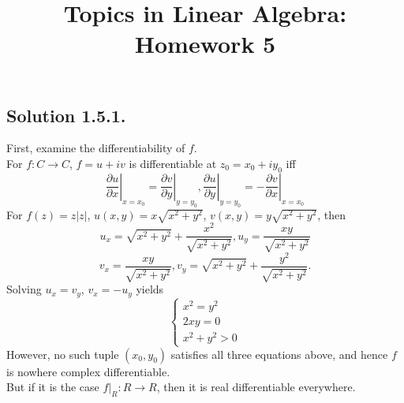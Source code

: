 \documentclass{article}
\title{Topics in Linear Algebra: Homework 5}
\begin{document}
\maketitle
\subsection*{Solution 1.5.1.}
First, examine the differentiability of $f$.\\
For $f: C\to C$, $f = u + iv$ is differentiable at $z_0=x_0+iy_0$ iff 
\[\left.\frac{\partial u}{\partial x}\right|_{x=x_0}= \left.\frac{\partial v}{\partial y}\right|_{y=y_0}, \left.\frac{\partial u}{\partial y}\right|_{y=y_0}=-\left.\frac{\partial v}{\partial x}\right|_{x=x_0}\]
For $f(z)=z|z|$, $u(x,y)=x\sqrt{x^2+y^2}$,  $v(x,y)=y\sqrt{x^2+y^2}$, then \\
\[ u_x = \sqrt{x^2+y^2}+\frac{x^2}{\sqrt{x^2+y^2}}, u_y=\frac{xy}{\sqrt{x^2+y^2}}\]
\[v_x= \frac{xy}{\sqrt{x^2+y^2}}, v_y=\sqrt{x^2+y^2}+\frac{y^2}{\sqrt{x^2+y^2}}.\]
Solving $u_x=v_y$, $v_x=-u_y$ yields 
\[\left\{\begin{array}{l}x^2=y^2\\2xy=0\\x^2+y^2>0\end{array}\right.\]
However, no such tuple $(x_0,y_0)$ satisfies all three equations above, and hence $f$ is nowhere complex differentiable.\\
But if it is the case $f|_R: R\to R$, then it is real differentiable everywhere.\\
\end{document}
